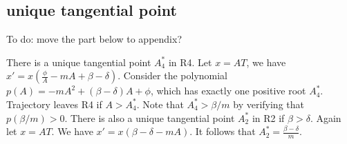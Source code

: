 \documentclass[review,authoryear]{elsarticle}
\begin{document}
\subsection*{unique tangential point}
To do: move the part below to appendix? 

There is a unique tangential point $A_{4}^{*}$ in R4. Let $x=AT$,
we have $x'=x(\frac{\phi}{A}-mA+\beta-\delta)$. Consider the polynomial
$p(A)=-mA^{2}+(\beta-\delta)A+\phi$, which has exactly one positive
root $A_{4}^{*}$. Trajectory leaves R4 if $A>A_{4}^{*}$. Note that
$A_{4}^{*}>\beta/m$ by verifying that $p(\beta/m)>0$. There is also
a unique tangential point $A_{2}^{*}$ in R2 if $\beta>\delta$. Again
let $x=AT$. We have $x'=x(\beta-\delta-mA)$. It follows that $A_{2}^{*}=\frac{\beta-\delta}{m}$. 


\end{document}
